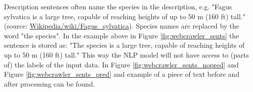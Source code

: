 \documentclass[a4paper, 12pt, oneside]{book} %
\begin{document}
Description sentences often name the species in the description, e.g. "Fagus sylvatica is a large tree, capable of reaching heights of up to 50 m (160 ft) tall." (source: \href{https://en.wikipedia.org/wiki/Fagus_sylvatica}{Wikipedia/wiki/Fagus\_sylvatica}).
Species names are replaced by the word "the species". 
In the example above in Figure \ref{fig:webcrawler_sents} the sentence is stored as: "The species is a large tree, capable of reaching heights of up to 50 m (160 ft) tall."
This way the NLP model will not have access to (parts of) the labels of the input data. In Figure \ref{fig:webcrawler_sents_nopred} and Figure \ref{fig:webcrawler_sents_pred} and example of a piece of text before and after processing can be found.

\end{document}
